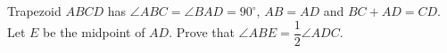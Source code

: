 Trapezoid $ABCD$ has $\angle ABC=\angle BAD=90^\circ$, $AB=AD$ and $BC+AD=CD$. Let $E$ be the midpoint of $AD$. Prove that $\angle ABE=\dfrac12\angle ADC$.
